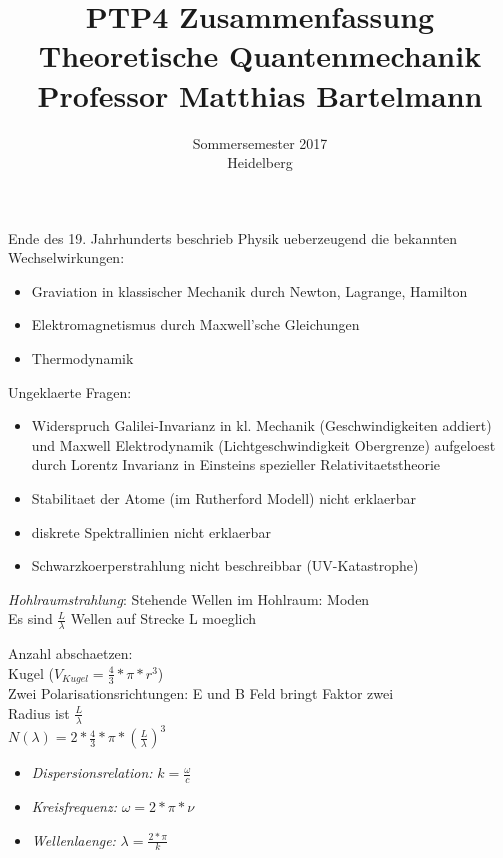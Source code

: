\documentclass{article}
\begin{document}
\title{PTP4 Zusammenfassung \\ Theoretische Quantenmechanik \\ Professor Matthias Bartelmann}

\date{Sommersemester 2017\\Heidelberg}
\maketitle


Ende des 19. Jahrhunderts beschrieb Physik ueberzeugend die bekannten Wechselwirkungen:
\begin{itemize}
\item Graviation in klassischer Mechanik durch Newton, Lagrange, Hamilton
\item Elektromagnetismus durch Maxwell'sche Gleichungen
\item Thermodynamik
\end{itemize}

Ungeklaerte Fragen: 
\begin{itemize}
\item Widerspruch Galilei-Invarianz in kl. Mechanik (Geschwindigkeiten addiert) und Maxwell Elektrodynamik (Lichtgeschwindigkeit Obergrenze) aufgeloest durch Lorentz Invarianz in Einsteins spezieller Relativitaetstheorie
\item Stabilitaet der Atome (im Rutherford Modell) nicht erklaerbar
\item diskrete Spektrallinien nicht erklaerbar
\item Schwarzkoerperstrahlung nicht beschreibbar (UV-Katastrophe)
\end{itemize}

\emph{Hohlraumstrahlung}: 
Stehende Wellen im Hohlraum: Moden \\
Es sind $\frac{L}{\lambda}$ Wellen auf Strecke L moeglich


Anzahl abschaetzen: \\
Kugel ($V_{Kugel}=\frac{4}{3}*\pi*r^3$)\\
Zwei Polarisationsrichtungen: E und B Feld bringt Faktor zwei\\
Radius ist $\frac{L}{\lambda}$\\
$N(\lambda)  = 2*\frac{4}{3}*\pi*(\frac{L}{\lambda})^3$\\

\begin{itemize}
\item\emph{Dispersionsrelation:} $k = \frac{\omega}{c}$
\item\emph{Kreisfrequenz:} $\omega = 2*\pi*\nu$
\item\emph{Wellenlaenge:} $\lambda = \frac{2*\pi}{k}$
\end{itemize}
\end{document}
